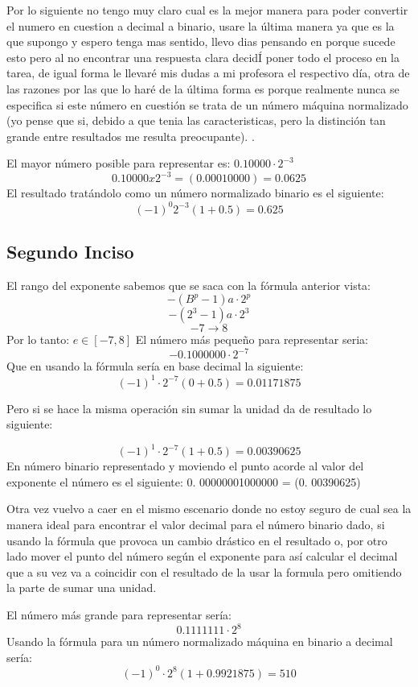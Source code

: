 \documentclass{article}
\begin{document}
Por lo siguiente no tengo muy claro cual es la mejor manera para poder convertir el
numero en cuestion a decimal a binario, usare la última manera ya que es la que
supongo y espero tenga mas sentido, llevo dias pensando en porque sucede esto
pero al no encontrar una respuesta clara decidÍ poner todo el proceso en la tarea, de
igual forma le llevaré mis dudas a mi profesora el respectivo día, otra de las razones
por las que lo haré de la última forma es porque realmente nunca se especifica si
este número en cuestión se trata de un número máquina normalizado (yo pense que
si, debido a que tenia las caracteristicas, pero la distinción tan grande entre
resultados me resulta preocupante). .

El mayor número posible para representar es: $0. 10000\cdot2^{-3}$
$$0. 10000x2^{-3} = (0. 00010000) = 0. 0625$$
El resultado tratándolo como un número normalizado binario es el siguiente:
$$(- 1)^0 2^{-3}(1 + 0. 5) = 0. 625$$

\subsection{Segundo Inciso}
El rango del exponente sabemos que se saca con la fórmula anterior vista:
$$-(B^p - 1 ) a\cdot2^p $$
$$-(2^3 - 1 ) a\cdot2^3 $$
$$-7 \rightarrow 8 $$
Por lo tanto: $e\in [-7,8]$
El número más pequeño para representar seria:
$$- 0. 1000000\cdot2^{-7}$$
Que en usando la fórmula sería en base decimal la siguiente:
$$(- 1)^1\cdot2^{-7}(0 + 0. 5) = 0. 01171875$$

Pero si se hace la misma operación sin sumar la unidad da de resultado lo siguiente:

$$(- 1)^1\cdot2^{-7}(1 + 0. 5) = 0. 00390625$$
En número binario representado y moviendo el punto acorde al valor del exponente
el número es el siguiente: 0. 00000001000000 = (0. 00390625)

Otra vez vuelvo a caer en el mismo escenario donde no estoy seguro de cual sea la
manera ideal para encontrar el valor decimal para el número binario dado, si usando
la fórmula que provoca un cambio drástico en el resultado o, por otro lado mover el punto del número según el exponente para así calcular el decimal que a su vez va a
coincidir con el resultado de la usar la formula pero omitiendo la parte de sumar una
unidad.

El número más grande para representar sería:
$$0. 1111111\cdot2^8$$
Usando la fórmula para un número normalizado máquina en binario a decimal sería:
$$(- 1)^0\cdot2^8(1 + 0. 9921875 ) = 510$$
\end{document}
